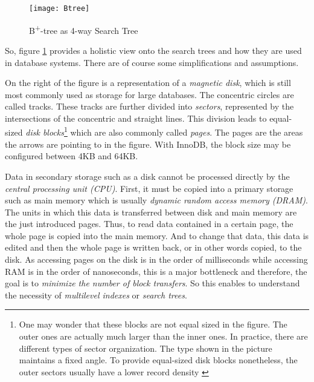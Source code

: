 \begin{figure}[H]
	\centering
	\texttt{[image: Btree]}
	\caption[B\textsuperscript{+}-tree as 4-way Search Tree]{B\textsuperscript{+}-tree as 4-way Search Tree }
	\label{fig:B+tree}
\end{figure}

So, figure \ref{fig:B+tree} provides a holistic view onto the search trees and how they are used in database systems. There are of course some simplifications and assumptions.\par 
On the right of the figure is a representation of a \emph{magnetic disk}, which is still most commonly used as storage for large databases. The concentric circles are called tracks. These tracks are further divided into \emph{sectors}, represented by the intersections of the concentric and straight lines. This division leads to equal-sized \emph{disk blocks}\footnote{One may wonder that these blocks are not equal sized in the figure. The outer ones are actually much larger than the inner ones. In practice, there are different types of sector organization. The type shown in the picture maintains a fixed angle. To provide equal-sized disk blocks nonetheless, the outer sectors usually have a lower record density \cite{DatabaseFundamentals}} which are also commonly called \emph{pages}. The pages are the areas the arrows are pointing to in the figure. With InnoDB, the block size may be configured between 4KB and 64KB.\par 
Data in secondary storage such as a disk cannot be processed directly by the \emph{central processing unit (CPU)}. First, it must be copied into a primary storage such as main memory which is usually \emph{dynamic random access memory (DRAM)}. The units in which this data is transferred between disk and main memory are the just introduced pages. Thus, to read data contained in a certain page, the whole page is copied into the main memory. And to change that data, this data is edited and then the whole page is written back, or in other words copied, to the disk. As accessing pages on the disk is in the order of milliseconds while accessing RAM is in the order of nanoseconds, this is a major bottleneck and therefore, the goal is to \emph{minimize the number of block transfers}. So this enables to understand the necessity of \emph{multilevel indexes} or \emph{search trees}.\par
